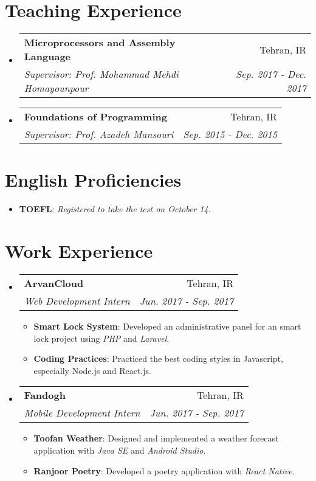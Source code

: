 \documentclass[letterpaper,11pt]{article}
\makeatletter
\newcommand{\resumeItem}[2]{
  \item\small{
    \textbf{#1}{: #2 \vspace{-2pt}}
  }
}
\newcommand{\resumeSubheading}[4]{
  \vspace{-1pt}\item
    \begin{tabular*}{0.97\textwidth}{l@{\extracolsep{\fill}}r}
      \textbf{#1} & #2 \\
      \textit{\small#3} & \textit{\small #4} \\
    \end{tabular*}\vspace{-5pt}
}
\newcommand{\resumeSubHeadingListStart}{\begin{itemize}[leftmargin=*]}
\newcommand{\resumeSubHeadingListEnd}{\end{itemize}}
\newcommand{\resumeItemListStart}{\begin{itemize}}
\newcommand{\resumeItemListEnd}{\end{itemize}\vspace{-5pt}}
\makeatother
\begin{document}
\section{Teaching Experience}
\resumeSubHeadingListStart

\resumeSubheading
{Microprocessors and Assembly Language}{Tehran, IR}
{Supervisor: Prof. Mohammad Mehdi Homayounpour}{Sep. 2017 - Dec. 2017}

\resumeSubheading
{Foundations of Programming}{Tehran, IR}
{Supervisor: Prof. Azadeh Mansouri}{Sep. 2015 - Dec. 2015}


\resumeSubHeadingListEnd


\section{English Proficiencies}
\resumeSubHeadingListStart
\item{
	\textbf{TOEFL}{: \textit{Registered to take the test on October 14.}}
	\hfill
}

\resumeSubHeadingListEnd



\section{Work Experience}
\resumeSubHeadingListStart

\resumeSubheading
{ArvanCloud}{Tehran, IR}
{Web Development Intern}{Jun. 2017 - Sep. 2017}
\resumeItemListStart
	\resumeItem{Smart Lock System}
	{Developed an administrative panel for an smart lock project using \textit{PHP} and \textit{Laravel}.}
	\resumeItem{Coding Practices}
	{Practiced the best coding styles in Javascript, especially Node.js and React.js.}
\resumeItemListEnd

\resumeSubheading
{Fandogh}{Tehran, IR}
{Mobile Development Intern}{Jun. 2017 - Sep. 2017}
\resumeItemListStart
\resumeItem{Toofan Weather}
{Designed and implemented a weather forecast application with \textit{Java SE} and \textit{Android Studio}.}
\resumeItem{Ranjoor Poetry}
{Developed a poetry application with \textit{React Native}.}
\resumeItemListEnd



\resumeSubHeadingListEnd




\end{document}
